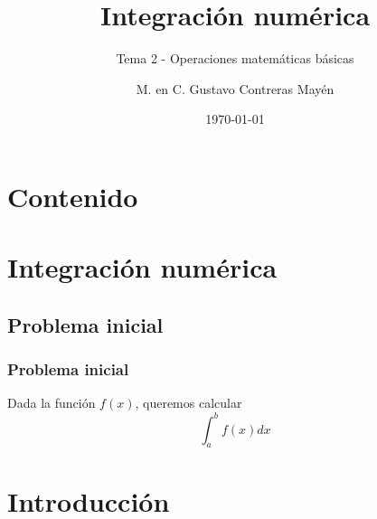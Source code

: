 



\title{Integración numérica}
\subtitle{Tema 2 - Operaciones matemáticas básicas}
\author{M. en C. Gustavo Contreras Mayén}
\date{\today}

\maketitle
\fontsize{14}{14}\selectfont
{}
\section*{Contenido}
\section{Integración numérica}
\subsection{Problema inicial}
\begin{frame}
\frametitle{Problema inicial}
Dada la función $f(x)$, queremos calcular
\[\int_{a}^{b} f(x) dx\]
\end{frame}
\section{Introducción}
